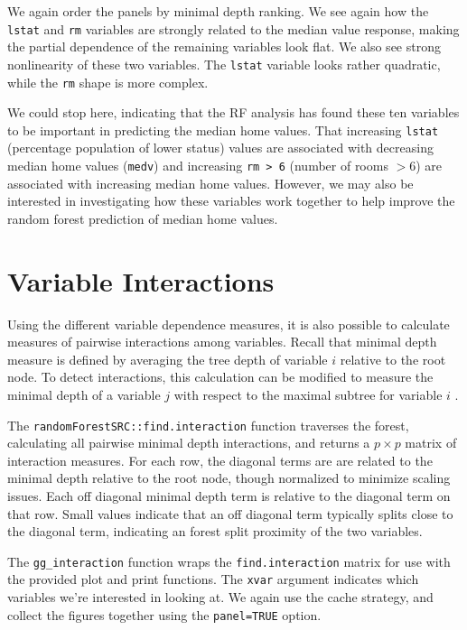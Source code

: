 \documentclass[article]{jss}
\begin{document}
We again order the panels by minimal depth ranking. We see again how the
\texttt{lstat} and \texttt{rm} variables are strongly related to the
median value response, making the partial dependence of the remaining
variables look flat. We also see strong nonlinearity of these two
variables. The \texttt{lstat} variable looks rather quadratic, while the
\texttt{rm} shape is more complex.

We could stop here, indicating that the RF analysis has found these ten
variables to be important in predicting the median home values. That
increasing \texttt{lstat} (percentage population of lower status) values
are associated with decreasing median home values (\texttt{medv}) and
increasing \texttt{rm\ \textgreater{}\ 6} (number of rooms \(> 6\)) are
associated with increasing median home values. However, we may also be
interested in investigating how these variables work together to help
improve the random forest prediction of median home values.

\hypertarget{variable-interactions}{%
\section{Variable Interactions}\label{variable-interactions}}

Using the different variable dependence measures, it is also possible to
calculate measures of pairwise interactions among variables. Recall that
minimal depth measure is defined by averaging the tree depth of variable
\(i\) relative to the root node. To detect interactions, this
calculation can be modified to measure the minimal depth of a variable
\(j\) with respect to the maximal subtree for variable \(i\)
\citep[\citet{Ishwaran:2011}]{Ishwaran:2010}.

The \texttt{randomForestSRC::find.interaction} function traverses the
forest, calculating all pairwise minimal depth interactions, and returns
a \(p \times p\) matrix of interaction measures. For each row, the
diagonal terms are are related to the minimal depth relative to the root
node, though normalized to minimize scaling issues. Each off diagonal
minimal depth term is relative to the diagonal term on that row. Small
values indicate that an off diagonal term typically splits close to the
diagonal term, indicating an forest split proximity of the two
variables.

The \texttt{gg\_interaction} function wraps the
\texttt{find.interaction} matrix for use with the provided plot and
print functions. The \texttt{xvar} argument indicates which variables
we're interested in looking at. We again use the cache strategy, and
collect the figures together using the \texttt{panel=TRUE} option.
\end{document}
